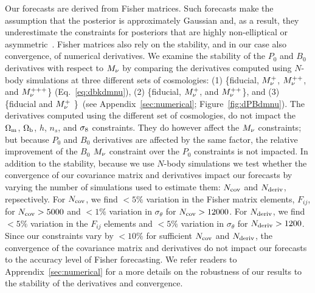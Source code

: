 Our forecasts are derived from Fisher matrices. Such forecasts make 
the assumption that the posterior is approximately Gaussian and, as a result, 
they underestimate the constraints for posteriors that are highly 
non-elliptical or asymmetric~\cite{wolz2012}. Fisher matrices also rely 
on the stability, and in our case also convergence, of numerical derivatives. 
We examine the stability of the $P_0$ and $B_0$ derivatives with respect 
to $M_\nu$ by comparing the derivatives computed using $N$-body simulations 
at three different sets of cosmologies: (1) \{fiducial, $M_\nu^{+}$, $M_\nu^{++}$, 
and $M_\nu^{+++}$\} (Eq.~\ref{eq:dbkdmnu}), (2) \{fiducial, $M_\nu^{+}$, 
and $M_\nu^{++}$\}, and (3) \{fiducial and $M_\nu^{+}$ \}~(see Appendix~\ref{sec:numerical}; Figure~\ref{fig:dPBdmnu}). 
The derivatives computed using the different set of cosmologies, do not impact 
the $\Omega_{\rm m}$, $\Omega_{\rm b}$, $h$, $n_s$, and $\sigma_8$ constraints. They do however affect the 
$M_\nu$ constraints; but because $P_0$ and $B_0$ derivatives are affected by 
the same factor, the relative improvement of the $B_0$ $M_\nu$ constraint over 
the $P_0$ constraints is not impacted. 
In addition to the stability, because we use $N$-body simulations we test 
whether the convergence of our covariance matrix and derivatives impact 
our forecasts by varying the number of simulations 
used to estimate them: $N_{\rm cov}$ and $N_{\rm deriv}$, repsectively. 
For $N_{\rm cov}$, we find $< 5\%$ variation in the Fisher matrix elements, 
$F_{ij}$, for $N_{\rm cov} > 5000$ and $< 1\%$ variation in $\sigma_\theta$
for $N_{\rm cov} > 12000$.  For $N_{\rm deriv}$, we find $< 5\%$ variation 
in the $F_{ij}$ elements and $< 5\%$ variation in $\sigma_\theta$ for 
$N_{\rm deriv} > 1200$. Since our constraints vary by $< 10\%$ for sufficient 
$N_{\rm cov}$ and $N_{\rm deriv}$, the convergence of the covariance matrix 
and derivatives do not impact our forecasts to the accuracy level of Fisher 
forecasting. We refer readers to Apprendix~\ref{sec:numerical} for a more 
details on the robustness of our results to the stability of the derivatives 
and convergence. 

